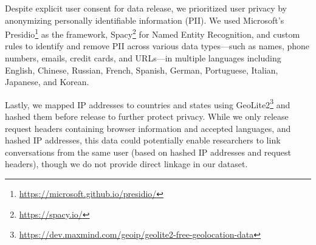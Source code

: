 \documentclass{article} %
\begin{document}
Despite explicit user consent for data release, we prioritized user privacy by anonymizing personally identifiable information (PII). We used Microsoft's Presidio\footnote{\url{https://microsoft.github.io/presidio/}} as the framework, Spacy\footnote{\url{https://spacy.io/}} for Named Entity Recognition, and custom rules to identify and remove PII across various data types---such as names, phone numbers, emails, credit cards, and URLs---in multiple languages including English, Chinese, Russian, French, Spanish, German, Portuguese, Italian, Japanese, and Korean. %


Lastly, we mapped IP addresses to countries and states using GeoLite2\footnote{\url{https://dev.maxmind.com/geoip/geolite2-free-geolocation-data}} and hashed them before release to further protect privacy. While we only release request headers containing browser information and accepted languages, and hashed IP addresses, this data could potentially enable researchers to link conversations from the same user (based on hashed IP addresses and request headers), though we do not provide direct linkage in our dataset.


\end{document}
